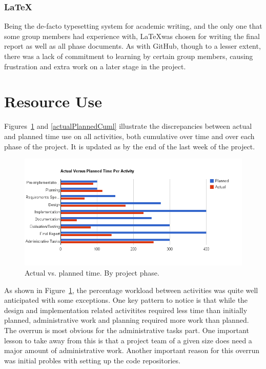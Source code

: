 \subsubsection{\LaTeX}
Being the de-facto typesetting system for academic writing, and the
only one that some group members had experience with, \LaTeX was
chosen for writing the final report as well as all phase documents. As
with GitHub, though to a lesser extent,  there was a lack of commitment to learning by certain
group members, causing frustration and extra work on a later stage
in the project.


\section{Resource Use}\label{resourceUse}

Figures~\ref{perActivity} and \ref{actualPlannedCuml} illustrate
the discrepancies between actual and planned time use on all
activities, both cumulative over time and over each phase of the
project. It is updated as by the end of the last week of the project.

\begin{centering}
  \begin{figure}
    \includegraphics[width = \textwidth]{Evaluation/time_per_activity.png}
    \caption{Actual vs. planned time. By project phase.}
    \label{perActivity}
  \end{figure}
\end{centering}

As shown in Figure~\ref{perActivity}, the percentage workload between activities was quite well anticipated with some exceptions. One key pattern to notice is that while the design and implementation related activitites required less time than initially planned, administrative work and planning required more work than planned. The overrun is most obvious for the administrative tasks part. One important lesson to take away from this is that a project team of a given size does need a major amount of administrative work. Another important reason for this overrun was initial probles with setting up the code repositories.

